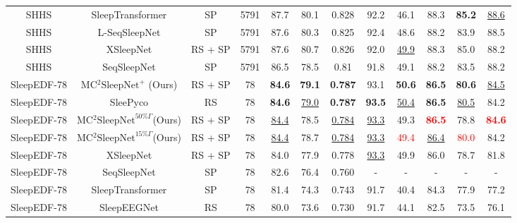 \begin{table*}
\begin{tabular}{cccc|ccc|ccccc}
SHHS & SleepTransformer \cite{phan2022sleeptransformer} & SP & 5791 & 87.7 & 80.1 & 0.828 & 92.2 & 46.1 & 88.3 & \textbf{85.2} & \underline{88.6} \\

SHHS & L-SeqSleepNet \cite{phan2023seqsleepnet} & SP & 5791 & 87.6 & 80.3 & 0.825 & 92.4 & 48.6 & 88.2 & 83.9 & 88.5 \\

SHHS & XSleepNet \cite{phan2021xsleepnet} & RS + SP & 5791 & 87.6 & 80.7 & 0.826 & 92.0 & \underline{49.9} & 88.3 & 85.0 & 88.2 \\

SHHS & SeqSleepNet \cite{phan2019seqsleepnet} & SP & 5791 & 86.5 & 78.5 & 0.81 & 91.8 & 49.1 & 88.2 & 83.5 & 88.2 \\

\hline

SleepEDF-78 & MC$^2$$\text{SleepNet}^+$ (Ours) & RS + SP & 78 & \textbf{84.6} & \textbf{79.1} & \textbf{0.787} & 93.1 & \textbf{50.6} & \textbf{86.5} & \textbf{80.6} & \underline{84.5} \\

SleepEDF-78 & SleePyco \cite{lee2024sleepyco} & RS & 78 & \textbf{84.6} & \underline{79.0} & \textbf{0.787} & \textbf{93.5} & \underline{50.4} & \textbf{86.5} & \underline{80.5} & 84.2 \\

SleepEDF-78 & MC$^2$$\text{SleepNet}^{50\%\Gamma}$(Ours) & RS + SP & 78 & \underline{84.4} & 78.5 & \underline{0.784} & \underline{93.3} & 49.3 & \textcolor{red}{\textbf{86.5}} & 78.8 & \textcolor{red}{\textbf{84.6}} \\

SleepEDF-78 & MC$^2$$\text{SleepNet}^{15\%\Gamma}$(Ours) & RS + SP & 78 & \underline{84.4} & 78.7 & \underline{0.784} & \underline{93.3} & \textcolor{red}{49.4} & \underline{86.4} & \textcolor{red}{80.0} & 84.2 \\

SleepEDF-78 & XSleepNet \cite{phan2021xsleepnet} & RS + SP & 78 & 84.0 & 77.9 & 0.778 & \underline{93.3} & 49.9 & 86.0 & 78.7 & 81.8 \\

SleepEDF-78 & SeqSleepNet \cite{phan2019seqsleepnet} & SP & 78 & 82.6 & 76.4 & 0.760 & - & - & - & - & - \\

SleepEDF-78 & SleepTransformer \cite{phan2022sleeptransformer} & SP & 78 & 81.4 & 74.3 & 0.743 & 91.7 & 40.4 & 84.3 & 77.9 & 77.2 \\

SleepEDF-78 & SleepEEGNet \cite{EEGSleepNet} & RS & 78 & 80.0 & 73.6 & 0.730 & 91.7 & 44.1 & 82.5 & 73.5 & 76.1 \\




\hline\hline
\end{tabular}
\end{table*}

